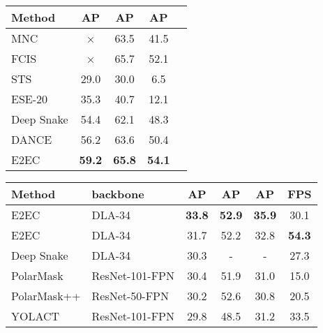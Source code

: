\documentclass[10pt,twocolumn,letterpaper]{article}
\begin{document}
\begin{table*}[t]
\begin{minipage}[c]{0.26\linewidth}
\centering
  \setlength{\tabcolsep}{0.2mm}
  \begin{footnotesize}
  \begin{tabular}{l|c|ccc}
    Method & AP & AP & AP \\
    \hline
    MNC \cite{mnc} & × & 63.5 & 41.5 \\
    FCIS \cite{fcis} & × & 65.7 & 52.1\\
    STS \cite{sts} & 29.0 & 30.0 & 6.5 \\
    ESE-20 \cite{ese} & 35.3 & 40.7 & 12.1 \\
    Deep Snake \cite{deepsnake} & 54.4 & 62.1 & 48.3 \\
    DANCE \cite{dance} & 56.2 & 63.6 & 50.4 \\
    E2EC & \textbf{59.2} & \textbf{65.8} & \textbf{54.1} \\
  \end{tabular}
  \end{footnotesize}\vspace{-4mm}
  \caption{\textbf{Results on SBD val set.}}
  \label{tab:sbd}
\end{minipage}\hfill
\begin{minipage}[c]{0.02\linewidth}
\end{minipage}\hfill
\begin{minipage}[c]{0.42\linewidth}
\centering
  \setlength{\tabcolsep}{0.8mm}
  \begin{footnotesize}
  \begin{tabular}{l|l|ccc|c}
    Method & backbone & AP & AP & AP & FPS\\
    \hline
    E2EC & DLA-34 & \textbf{33.8} & \textbf{52.9} & \textbf{35.9} & 30.1\\
    E2EC & DLA-34 & 31.7 & 52.2 & 32.8 & \textbf{54.3}\\
    Deep Snake \cite{deepsnake} & DLA-34 & 30.3 & - & - & 27.3 \\
    PolarMask \cite{polarmask} & ResNet-101-FPN & 30.4 & 51.9 & 31.0 & 15.0 \\
    PolarMask++ \cite{polarmask++}& ResNet-50-FPN & 30.2 & 52.6 & 30.8 & 20.5\\ 
    YOLACT \cite{yolact} & ResNet-101-FPN & 29.8 & 48.5 & 31.2 & 33.5\\
  \end{tabular}
  \end{footnotesize}\vspace{-3mm}

\end{minipage}
\end{table*}
\end{document}
